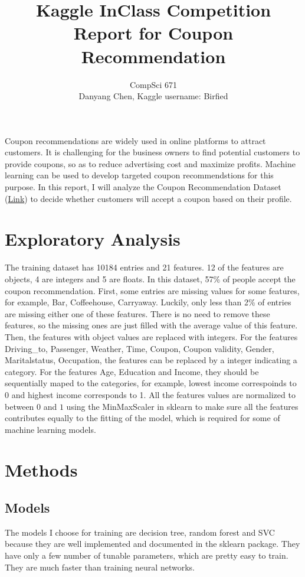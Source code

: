 \documentclass[12pt]{article}
\title{Kaggle InClass Competition Report for Coupon Recommendation}
\author{CompSci 671\\
Danyang Chen, Kaggle username: Birfied
}
\theoremstyle{definition}
\begin{document}
\maketitle

\noindent Coupon recommendations are widely used in online platforms to attract customers. It is challenging for the business owners to find potential customers to provide coupons, so as to reduce advertising cost and maximize profits. Machine learning can be used to develop targeted coupon recommendstions for this purpose. In this report, I will analyze the Coupon Recommendation Dataset (\href{https://www.kaggle.com/c/duke-cs671-fall21-coupon-recommendation-data/}{Link}) to decide whether customers will accept a coupon based on their profile.

\section{Exploratory Analysis}
The training dataset has 10184 entries and 21 features. 12 of the features are objects, 4 are integers and 5 are floats. In this dataset, 57\% of people accept the coupon recommendation. First, some entries are missing values for some features, for example, Bar, Coffeehouse, Carryaway. Luckily, only less than 2\% of entries are missing either one of these features. There is no need to remove these features, so the missing ones are just filled with the average value of this feature. Then, the features with object values are replaced with integers. For the features Driving\_to, Passenger, Weather, Time, Coupon, Coupon validity, Gender, Maritalstatus, Occupation, the features can be replaced by a integer indicating a category. For the features Age, Education and Income, they should be sequentially maped to the categories, for example, lowest income correspoinds to 0 and highest income corresponds to 1. All the features values are normalized to between $0$ and $1$ using the MinMaxScaler in sklearn to make sure all the features contributes equally to the fitting of the model, which is required for some of machine learning models.

\section{Methods}
\subsection{Models}
The models I choose for training are decision tree, random forest and SVC because they are well implemented and documented in the sklearn package. They have only a few number of tunable parameters, which are pretty easy to train. They are much faster than training neural networks.
\end{document}
